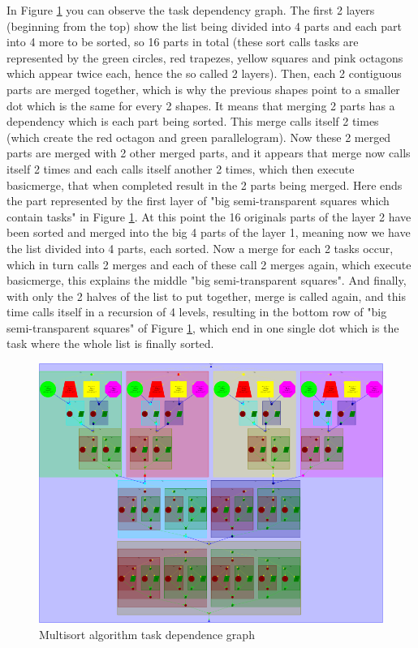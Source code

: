 \documentclass[12]{article}
\begin{document}
In Figure \ref{multisort_paraver} you can observe the task dependency graph. The first 2 layers (beginning from the top) show the list being divided into 4 parts and each part into 4 more to be sorted, so 16 parts in total (these sort calls tasks are represented by the green circles, red trapezes, yellow squares and pink octagons which appear twice each, hence the so called 2 layers).  Then, each 2 contiguous parts are merged together, which is why the previous shapes point to a smaller dot which is the same for every 2 shapes. It means that merging 2 parts has a dependency which is each part being sorted. This merge calls itself 2 times (which create the red octagon and green parallelogram). Now these 2 merged parts are merged with 2 other merged parts, and it appears that merge now calls itself 2 times and each calls itself another 2 times, which then execute basicmerge, that when completed result in the 2 parts being merged. Here ends the part represented by the first layer of "big semi-transparent squares which contain tasks" in Figure \ref{multisort_paraver}. At this point the 16 originals parts of the layer 2  have been sorted and merged into the big 4 parts of the layer 1, meaning now we have the list divided into 4 parts, each sorted. Now a merge for each 2 tasks occur, which in turn calls 2 merges and each of these call 2 merges again, which execute basicmerge, this explains the middle "big semi-transparent squares". And finally, with only the 2 halves of the list to put together, merge is called again, and this time calls itself in a recursion of 4 levels, resulting in the bottom row of "big semi-transparent squares" of Figure \ref{multisort_paraver}, which end in one single dot which is the task where the whole list is finally sorted.

\begin{figure}[H]
    \centering
    \includegraphics[scale=0.40]{images/multisort_tareador.png}
    \caption{Multisort algorithm task dependence graph}
    \label{multisort_paraver}
\end{figure}
\end{document}
